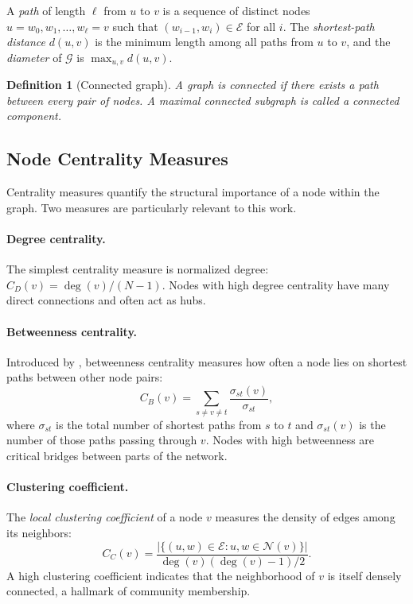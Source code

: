 \documentclass[11pt,a4paper,twoside]{tesis}
\newtheorem{definition}{Definition}[chapter]
\newcommand{\G}{\mathcal{G}}
\newcommand{\E}{\mathcal{E}}
\begin{document}
A \emph{path} of length $\ell$ from $u$ to $v$ is a sequence of distinct nodes
$u = w_0, w_1, \ldots, w_\ell = v$ such that $(w_{i-1}, w_i) \in \E$ for all $i$.
The \emph{shortest-path distance} $d(u,v)$ is the minimum length among all paths from
$u$ to $v$, and the \emph{diameter} of $\G$ is $\max_{u,v} d(u,v)$.

\begin{definition}[Connected graph]
A graph is \emph{connected} if there exists a path between every pair of nodes. A
maximal connected subgraph is called a \emph{connected component}.
\end{definition}

\subsection{Node Centrality Measures}
\label{sec:centrality}

Centrality measures quantify the structural importance of a node within the graph.
Two measures are particularly relevant to this work.

\paragraph{Degree centrality.}
The simplest centrality measure is normalized degree:
$C_D(v) = \deg(v)/(N-1)$. Nodes with high degree centrality have many direct
connections and often act as hubs.

\paragraph{Betweenness centrality.}
Introduced by \textcite{freeman1977betweenness}, betweenness centrality measures how
often a node lies on shortest paths between other node pairs:
\[
C_B(v) = \sum_{s \neq v \neq t} \frac{\sigma_{st}(v)}{\sigma_{st}},
\]
where $\sigma_{st}$ is the total number of shortest paths from $s$ to $t$ and
$\sigma_{st}(v)$ is the number of those paths passing through $v$. Nodes with high
betweenness are critical bridges between parts of the network.

\paragraph{Clustering coefficient.}
The \emph{local clustering coefficient} of a node $v$ measures the density of edges
among its neighbors:
\[
C_C(v) = \frac{|\{(u,w) \in \E : u,w \in \mathcal{N}(v)\}|}{\deg(v)(\deg(v)-1)/2}.
\]
A high clustering coefficient indicates that the neighborhood of $v$ is itself densely
connected, a hallmark of community membership.
\end{document}
